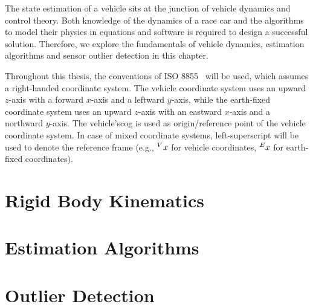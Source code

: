 The state estimation of a vehicle sits at the junction of vehicle dynamics and control theory. Both knowledge of the dynamics of a race car and the algorithms to model their physics in equations and software is required to design a successful solution. Therefore, we explore the fundamentals of vehicle dynamics, estimation algorithms and sensor outlier detection in this chapter.

Throughout this thesis, the conventions of ISO 8855~\cite{ISO.2011} will be used, which assumes a right-handed coordinate system. The vehicle coordinate system uses an upward $z$-axis with a forward $x$-axis and a leftward $y$-axis, while the earth-fixed coordinate system uses an upward $z$-axis with an eastward $x$-axis and a northward $y$-axis. The vehicle's\gls{cog} is used as origin/reference point of the vehicle coordinate system. In case of mixed coordinate systems, left-superscript will be used to denote the reference frame (e.g., $\prescript{V}{}{x}$ for vehicle coordinates, $\prescript{E}{}{x}$ for earth-fixed coordinates).

\section{Rigid Body Kinematics}


\section{Estimation Algorithms}


\section{Outlier Detection}

